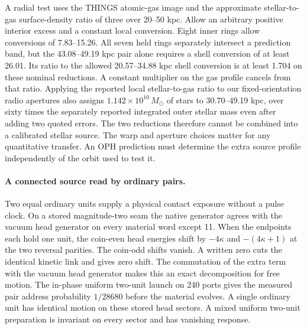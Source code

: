 \documentclass[11pt]{article}
\begin{document}
A radial test uses the THINGS atomic-gas image and the approximate
stellar-to-gas surface-density ratio of three over 20--50 kpc.
Allow an arbitrary positive interior excess and a constant local
conversion. Eight inner rings allow conversions of 7.83--15.26.
All seven held rings separately intersect a prediction band, but the
43.08--49.19 kpc pair alone requires a shell conversion of at least
26.01. Its ratio to the allowed 20.57--34.88 kpc shell conversion is
at least 1.704 on these nominal reductions. A constant multiplier on
the gas profile cancels from that ratio. Applying the reported local
stellar-to-gas ratio to our fixed-orientation radio apertures also
assigns $1.142\times10^{10}\,M_\odot$ of stars to 30.70--49.19 kpc,
over sixty times the separately reported integrated outer stellar mass
even after adding two quoted errors. The two reductions therefore
cannot be combined into a calibrated stellar source. The warp and
aperture choices matter for any quantitative transfer. An OPH
prediction must determine the extra source profile independently of
the orbit used to test it.

\paragraph{A connected source read by ordinary pairs.}
Two equal ordinary units supply a physical contact exposure without a
pulse clock. On a stored magnitude-two seam the native generator agrees
with the vacuum head generator on every material word except 11.
When the endpoints each hold one unit, the coin-even head energies
shift by $-4\kappa$ and $-(4\kappa+1)$ at the two reversal parities.
The coin-odd shifts vanish. A written zero cuts the identical kinetic
link and gives zero shift. The commutation of the extra term with the
vacuum head generator makes this an exact decomposition for free
motion. The in-phase uniform two-unit launch on 240 ports gives the
measured pair address probability $1/28680$ before the material
evolves. A single ordinary unit has identical motion on these stored
head sectors. A mixed uniform two-unit preparation is invariant on
every sector and has vanishing response.
\end{document}
